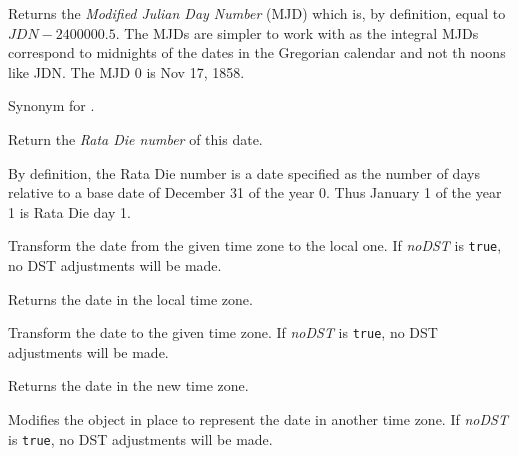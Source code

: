 Returns the {\it Modified Julian Day Number} (MJD) which is, by definition,
equal to $JDN - 2400000.5$. The MJDs are simpler to work with as the integral
MJDs correspond to midnights of the dates in the Gregorian calendar and not th
noons like JDN. The MJD $0$ is Nov 17, 1858.


\label{wxdatetimegetmjd}


Synonym for .


\label{wxdatetimegetratadie}


Return the {\it Rata Die number} of this date.

By definition, the Rata Die number is a date specified as the number of days
relative to a base date of December 31 of the year 0. Thus January 1 of the
year 1 is Rata Die day 1.



\label{wxdatetimefromtimezone}


Transform the date from the given time zone to the local one. If {\it noDST} is 
{\tt true}, no DST adjustments will be made.

Returns the date in the local time zone.


\label{wxdatetimetotimezone}


Transform the date to the given time zone. If {\it noDST} is {\tt true}, no
DST adjustments will be made.

Returns the date in the new time zone.


\label{wxdatetimemaketimezone}


Modifies the object in place to represent the date in another time zone. If
{\it noDST} is {\tt true}, no DST adjustments will be made.


